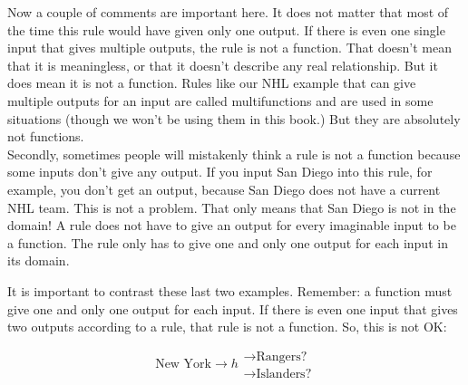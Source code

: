 Now a couple of comments are important here. It does not matter that most of the time this rule would have given only one output. If there is even one single input that gives multiple outputs, the rule is not a function. That doesn’t mean that it is meaningless, or that it doesn’t describe any real relationship. But it does mean it is not a function. Rules like our NHL example that can give multiple outputs for an input are called multifunctions and are used in some situations (though we won’t be using them in this book.) But they are absolutely not functions.\\

Secondly, sometimes people will mistakenly think a rule is not a function because some inputs don’t give any output. If you input San Diego into this rule, for example, you don’t get an output, because San Diego does not have a current NHL team. This is not a problem. That only means that San Diego is not in the domain! A rule does not have to give an output for every imaginable input to be a function. The rule only has to give one and only one output for each input in its domain.



It is important to contrast these last two examples. Remember: a function must give one and only one output for each input. If there is even one input that gives two outputs according to a rule, that rule is not a function. So, this is not OK:

$$ \text{New York} \rightarrow \boxed{h} \begin{array}{l} \rightarrow \text{Rangers?}\\ \rightarrow \text{Islanders?} \end{array}$$

